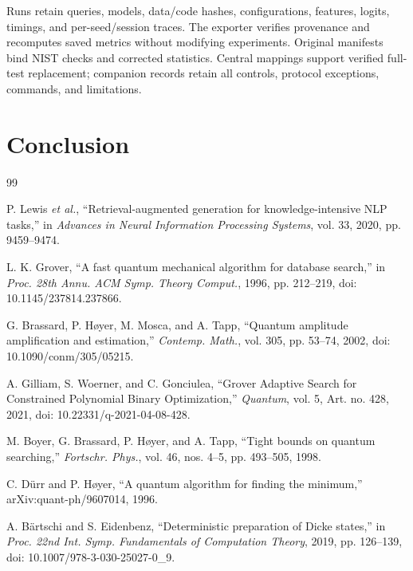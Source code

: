 \documentclass[conference]{IEEEtran}
\newcommand{\resultinput}[1]{}
\begin{document}
Runs retain queries, models, data/code hashes, configurations, features, logits, timings, and per-seed/session traces. The exporter verifies provenance and recomputes saved metrics without modifying experiments. Original manifests bind NIST checks and corrected statistics. Central mappings support verified full-test replacement; companion records retain all controls, protocol exceptions, commands, and limitations.

\section{Conclusion}\label{sec:conclusion}
\resultinput{conclusion.tex}
\par

\begin{thebibliography}{99}

P. Lewis \textit{et al.}, ``Retrieval-augmented generation for knowledge-intensive NLP tasks,'' in \textit{Advances in Neural Information Processing Systems}, vol. 33, 2020, pp. 9459--9474.

L. K. Grover, ``A fast quantum mechanical algorithm for database search,'' in \textit{Proc. 28th Annu. ACM Symp. Theory Comput.}, 1996, pp. 212--219, doi: 10.1145/237814.237866.

G. Brassard, P. H\o yer, M. Mosca, and A. Tapp, ``Quantum amplitude amplification and estimation,'' \textit{Contemp. Math.}, vol. 305, pp. 53--74, 2002, doi: 10.1090/conm/305/05215.

A. Gilliam, S. Woerner, and C. Gonciulea, ``Grover Adaptive Search for Constrained Polynomial Binary Optimization,'' \textit{Quantum}, vol. 5, Art. no. 428, 2021, doi: 10.22331/q-2021-04-08-428.

M. Boyer, G. Brassard, P. H\o yer, and A. Tapp, ``Tight bounds on quantum searching,'' \textit{Fortschr. Phys.}, vol. 46, nos. 4--5, pp. 493--505, 1998.

C. D\"urr and P. H\o yer, ``A quantum algorithm for finding the minimum,'' arXiv:quant-ph/9607014, 1996.

A. B\"artschi and S. Eidenbenz, ``Deterministic preparation of Dicke states,'' in \textit{Proc. 22nd Int. Symp. Fundamentals of Computation Theory}, 2019, pp. 126--139, doi: 10.1007/978-3-030-25027-0\_9.


\end{thebibliography}
\end{document}
